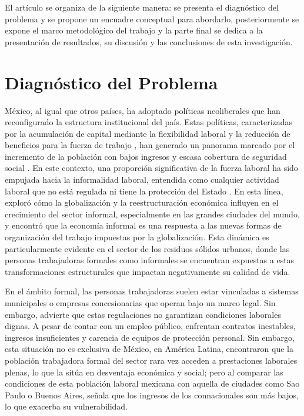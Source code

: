 \documentclass[
  spanish,
  11pt,
  a4paper,
]{scrbook}
\begin{document}
El artículo se organiza de la siguiente manera: se presenta el
diagnóstico del problema y se propone un encuadre conceptual para
abordarlo, posteriormente se expone el marco metodológico del trabajo y
la parte final se dedica a la presentación de resultados, su discusión y
las conclusiones de esta investigación.

\section*{Diagnóstico del Problema}\label{diagnuxf3stico-del-problema}


México, al igual que otros países, ha adoptado políticas neoliberales
que han reconfigurado la estructura institucional del país. Estas
políticas, caracterizadas por la acumulación de capital mediante la
flexibilidad laboral y la reducción de beneficios para la fuerza de
trabajo \autocite{Harvey2007}, han generado un panorama marcado por el
incremento de la población con bajos ingresos y escasa cobertura de
seguridad social \autocite{Martinez2019}. En este contexto, una
proporción significativa de la fuerza laboral ha sido empujada hacia la
informalidad laboral, entendida como cualquier actividad laboral que no
está regulada ni tiene la protección del Estado \autocite{Hart1971}. En
esta línea, \textcite{Sassen1991} exploró cómo la globalización y la
reestructuración económica influyen en el crecimiento del sector
informal, especialmente en las grandes ciudades del mundo, y encontró
que la economía informal es una respuesta a las nuevas formas de
organización del trabajo impuestas por la globalización. Esta dinámica
es particularmente evidente en el sector de los residuos sólidos
urbanos, donde las personas trabajadoras formales como informales se
encuentran expuestas a estas transformaciones estructurales que impactan
negativamente su calidad de vida.

En el ámbito formal, las personas trabajadoras suelen estar vinculadas a
sistemas municipales o empresas concesionarias que operan bajo un marco
legal. Sin embargo, \textcite{Espinosa2013} advierte que estas
regulaciones no garantizan condiciones laborales dignas. A pesar de
contar con un empleo público, enfrentan contratos inestables, ingresos
insuficientes y carencia de equipos de protección personal. Sin embargo,
esta situación no es exclusiva de México, en América Latina,
\textcite{Acurio1997} encontraron que la población trabajadora formal
del sector rara vez acceden a prestaciones laborales plenas, lo que la
sitúa en desventaja económica y social; pero al comparar las condiciones
de esta población laboral mexicana con aquella de ciudades como Sao
Paulo o Buenos Aires, \textcite{Villanova2012} señala que los ingresos
de los connacionales son más bajos, lo que exacerba su vulnerabilidad.
\end{document}
